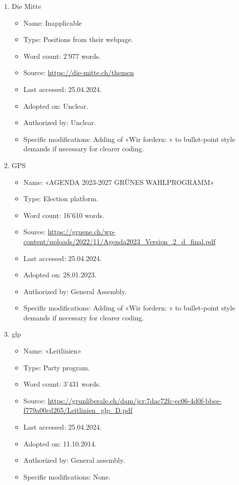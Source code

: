 \documentclass[11pt,a4paper]{article}
\begin{document}
\begin{enumerate}
\item Die Mitte
    \begin{itemize}
        \item Name: Inapplicable
        \item Type: Positions from their webpage.
        \item Word count: 2’977 words.
        \item Source: \url{https://die-mitte.ch/themen}
        \item Last accessed: 25.04.2024.
        \item Adopted on: Unclear.
        \item Authorized by: Unclear.
        \item Specific modifications: Adding of «Wir fordern: » to bullet-point style demands if necessary for clearer coding.
    \end{itemize}

\newpage
\item GPS
    \begin{itemize}
        \item Name: «AGENDA 2023-2027 GRÜNES WAHLPROGRAMM»
        \item Type: Election platform.
        \item Word count: 16’610 words.
        \item Source: \url{https://gruene.ch/wp-content/uploads/2022/11/Agenda2023_Version_2_d_final.pdf}
        \item Last accessed: 25.04.2024.
        \item Adopted on: 28.01.2023.
        \item Authorized by: General Assembly.
        \item Specific modifications: Adding of «Wir fordern: » to bullet-point style demands if necessary for clearer coding.
    \end{itemize}

\item glp
    \begin{itemize}
        \item Name: «Leitlinien»
        \item Type: Party program.
        \item Word count: 3’431 words.
        \item Source: \url{https://grunliberale.ch/dam/jcr:7dac72fc-ec06-4d0f-bbee-f779a00cd265/Leitlinien_glp_D.pdf}
        \item Last accessed: 25.04.2024.
        \item Adopted on: 11.10.2014.
        \item Authorized by: General assembly.
        \item Specific modifications: None.
    \end{itemize}
\end{enumerate}
\end{document}
